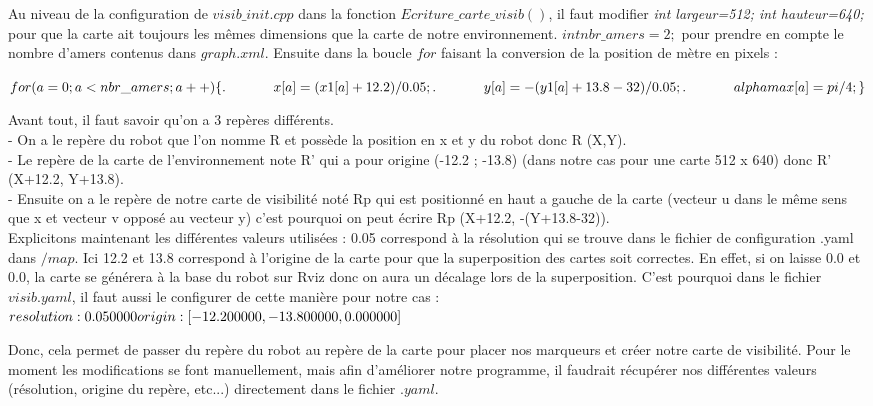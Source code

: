 \documentclass[10pt,a4paper]{article}
\begin{document}
Au niveau de la configuration de $visib\_init.cpp$ dans la fonction $Ecriture\_carte\_visib()$, il faut modifier \textit{int largeur=512;	 int hauteur=640;} pour que la carte ait toujours les mêmes dimensions que la carte de notre environnement. $int nbr\_amers=2;$ pour prendre en compte le nombre d'amers contenus dans $graph.xml$. Ensuite dans la boucle $for$ faisant la conversion de la position de mètre en pixels :

$\\
for(a=0;a<nbr\_amers;a++)\\
	\{ \\
. \hspace{35pt}    x[a]=(x1[a]+12.2)/0.05;\\
. \hspace{35pt}    y[a]=-(y1[a]+13.8-32)/0.05;\\
. \hspace{35pt}    alphamax[a]=pi/4;\\
	\}\\
	$


Avant tout, il faut savoir qu'on a 3 repères différents.\\ 
- On a le repère du robot que l'on nomme R et possède la position en x et y du robot donc R (X,Y).\\
- Le repère de la carte de l'environnement note R' qui a pour origine (-12.2 ; -13.8) (dans notre cas pour une carte 512 x 640) donc R' (X+12.2, Y+13.8).\\ 
- Ensuite on a le repère de notre carte de visibilité noté Rp qui est positionné en haut a gauche de la carte (vecteur u dans le même sens que x et vecteur v opposé au vecteur y) c'est pourquoi on peut écrire Rp (X+12.2, -(Y+13.8-32)).\\

Explicitons maintenant les différentes valeurs utilisées : 0.05 correspond à la résolution qui se trouve dans le fichier de configuration .yaml dans $/map$. Ici 12.2 et 13.8 correspond à l'origine de la carte pour que la superposition des cartes soit correctes. En effet, si on laisse 0.0 et 0.0, la carte se générera à la base du robot sur Rviz donc on aura un décalage lors de la superposition. C'est pourquoi dans le fichier $visib.yaml$, il faut aussi le configurer de cette manière pour notre cas :\\
$resolution: 0.050000\\
origin: [-12.200000, -13.800000, 0.000000]\\
$

Donc, cela permet de passer du repère du robot au repère de la carte pour placer nos marqueurs et créer notre carte de visibilité. Pour le moment les modifications se font manuellement, mais afin d'améliorer notre programme, il faudrait récupérer nos différentes valeurs (résolution, origine du repère, etc...) directement dans le fichier $.yaml$.\\
\end{document}
